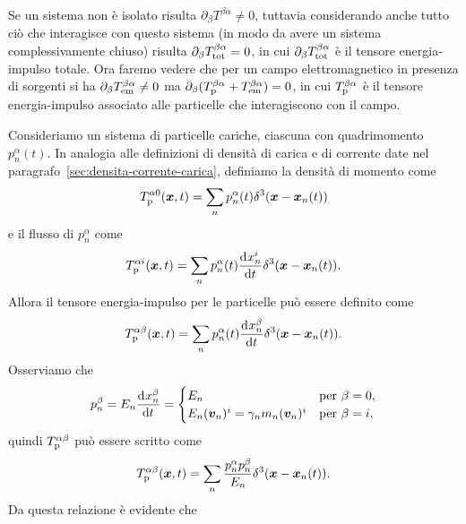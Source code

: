 Se un sistema non è isolato risulta $\partial_{\beta}T^{\beta\alpha} \neq 0$,
tuttavia considerando anche tutto ciò che interagisce con questo sistema (in
modo da avere un sistema complessivamente chiuso) risulta
$\partial_{\beta}T_{\textup{tot}}^{\beta\alpha} = 0$, in cui
$\partial_{\beta}T_{\textup{tot}}^{\beta\alpha}$ è il tensore energia-impulso
totale.  Ora faremo vedere che per un campo elettromagnetico in presenza di
sorgenti si ha $\partial_{\beta}T_{\textup{em}}^{\beta\alpha} \neq 0$ ma
$\partial_{\beta}(T_{\textup{p}}^{\beta\alpha} + T_{\textup{em}}^{\beta\alpha})
= 0$, in cui $T_{\textup{p}}^{\beta\alpha}$ è il tensore energia-impulso
associato alle particelle che interagiscono con il campo.

Consideriamo un sistema di particelle cariche, ciascuna con quadrimomento
$p_{n}^{\alpha}(t)$.  In analogia alle definizioni di densità di carica e di
corrente date nel paragrafo~\ref{sec:densita-corrente-carica}, definiamo la
densità di momento come
\begin{equation}
  T_{\textup{p}}^{\alpha0}(\bm{x}, t) = \sum_{n} p_{n}^{\alpha}(t)
  \delta^{3}(\bm{x} - \bm{x}_{n}(t))
\end{equation}
e il flusso di $p_{n}^{\alpha}$ come
\begin{equation}
  T_{\textup{p}}^{\alpha i}(\bm{x}, t) = \sum_{n} p_{n}^{\alpha}(t)
  \frac{{\mathop{}\!\mathrm{d}^{}}x_{n}^{i}}{\mathop{}\!\mathrm{d} {t}^{}} \delta^{3}(\bm{x} - \bm{x}_{n}(t)).
\end{equation}
Allora il tensore energia-impulso per le particelle può essere definito come
\begin{equation}
  T_{\textup{p}}^{\alpha\beta}(\bm{x}, t) = \sum_{n} p_{n}^{\alpha}(t)
  \frac{{\mathop{}\!\mathrm{d}^{}}x_{n}^{\beta}}{\mathop{}\!\mathrm{d} {t}^{}} \delta^{3}(\bm{x} - \bm{x}_{n}(t)).
\end{equation}
Osserviamo che
\begin{equation}
  p_{n}^{\beta} = E_{n} \frac{{\mathop{}\!\mathrm{d}^{}}x_{n}^{\beta}}{\mathop{}\!\mathrm{d} {t}^{}} =
  \begin{cases}
    E_{n} & \text{per $\beta = 0$}, \\
    E_{n}(\bm{v}_{n})^{i} = \gamma_{n}m_{n}(\bm{v}_{n})^{i} & \text{per $\beta =
      i$},
  \end{cases}
\end{equation}
quindi $T_{\textup{p}}^{\alpha\beta}$ può essere scritto come
\begin{equation}
  T_{\textup{p}}^{\alpha\beta}(\bm{x}, t) = \sum_{n} \frac{p_{n}^{\alpha}
    p_{n}^{\beta}}{E_{n}} \delta^{3}(\bm{x} - \bm{x}_{n}(t)).
\end{equation}
Da questa relazione è evidente che

